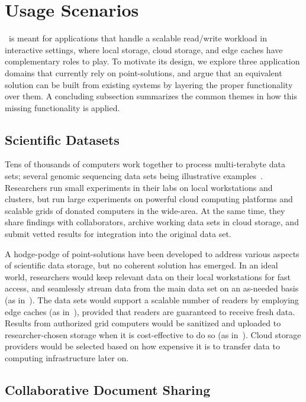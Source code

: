 \section{Usage Scenarios}
\label{sec:motivation}

\Syndicate\ is meant for applications that handle a scalable
read/write workload in interactive settings,
where local storage, cloud storage, and edge
caches have complementary roles to play.  To motivate its
design, we explore three application domains that currently
rely on point-solutions, and argue that an
equivalent solution can be built from existing systems by
layering the proper functionality over them.  A concluding subsection
summarizes the common themes in how this missing functionality is applied.

\subsection{Scientific Datasets}

Tens of thousands of computers work together to process multi-terabyte
data sets; several genomic sequencing data sets being illustrative
examples~\cite{GenBank,metagenomics,1000genomes,treeoflife}.
Researchers run small experiments in their labs on local workstations
and clusters, but run large experiments on powerful cloud computing platforms
and scalable grids of donated computers in the wide-area.
At the same time, they share findings with collaborators,
archive working data sets in cloud storage,
and submit vetted results for integration into the original data set.

A hodge-podge of point-solutions have been developed to address various aspects
of scientific data storage, but no coherent solution has emerged.
In an ideal world, researchers
would keep relevant data on their local workstations for fast access, and
seamlessly stream data from the main data set on an
as-needed basis (as in~\cite{irods}).  The data sets would
support a scalable number of readers by employing edge caches (as in~\cite{cern-vmfs}),
provided that readers are guaranteed to receive fresh data.
Results from authorized grid computers would be sanitized and uploaded to researcher-chosen
storage when it is cost-effective to do so (as in~\cite{folding-at-home}).
Cloud storage providers would be selected based on 
how expensive it is to transfer data to computing infrastructure
later on.

\subsection{Collaborative Document Sharing}

